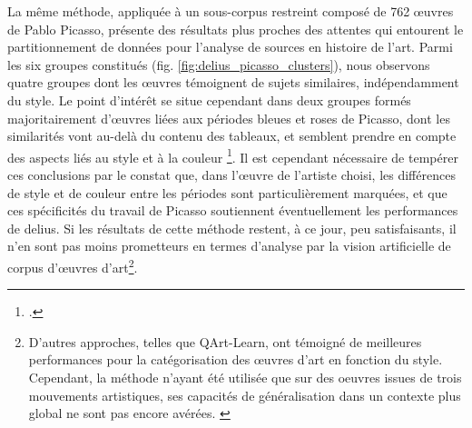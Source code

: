 	La même méthode, appliquée à un sous-corpus restreint composé de 762 œuvres de Pablo Picasso, présente des résultats plus proches des attentes qui entourent le partitionnement de données pour l'analyse de sources en histoire de l'art. Parmi les six groupes constitués (fig. \ref{fig:delius_picasso_clusters}), nous observons quatre groupes dont les œuvres témoignent de sujets similaires, indépendamment du style. Le point d'intérêt se situe cependant dans deux groupes formés majoritairement d'œuvres liées aux périodes bleues et roses de Picasso, dont les similarités vont au-delà du contenu des tableaux, et semblent prendre en compte des aspects liés au style et à la couleur \footcite{castellanoDeepLearningApproach2022}. Il est cependant nécessaire de tempérer ces conclusions par le constat que, dans l'œuvre de l'artiste choisi, les différences de style et de couleur entre les périodes sont particulièrement marquées, et que ces spécificités du travail de Picasso soutiennent éventuellement les performances de \acrshort{delius}. Si les résultats de cette méthode restent, à ce jour, peu satisfaisants, il n'en sont pas moins prometteurs en termes d'analyse par la vision artificielle de corpus d'œuvres d'art\footnote{D'autres approches, telles que QArt-Learn, ont témoigné de meilleures performances pour la catégorisation des œuvres d'art en fonction du style. Cependant, la méthode n'ayant été utilisée que sur des oeuvres issues de trois mouvements artistiques, ses capacités de généralisation dans un contexte plus global ne sont pas encore avérées. \cite{falomirCategorizingPaintingsArt2018}}.